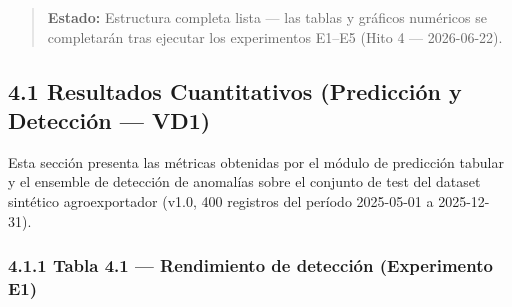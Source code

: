 \begin{quote}
\textbf{Estado:} Estructura completa lista --- las tablas y gráficos
numéricos se completarán tras ejecutar los experimentos E1--E5 (Hito 4
--- 2026-06-22).
\end{quote}

\subsection{4.1 Resultados Cuantitativos (Predicción y Detección ---
VD1)}\label{resultados-cuantitativos-predicciuxf3n-y-detecciuxf3n-vd1}

Esta sección presenta las métricas obtenidas por el módulo de predicción
tabular y el ensemble de detección de anomalías sobre el conjunto de
test del dataset sintético agroexportador (v1.0, 400 registros del
período 2025-05-01 a 2025-12-31).

\subsubsection{4.1.1 Tabla 4.1 --- Rendimiento de detección (Experimento
E1)}\label{tabla-4.1-rendimiento-de-detecciuxf3n-experimento-e1}

